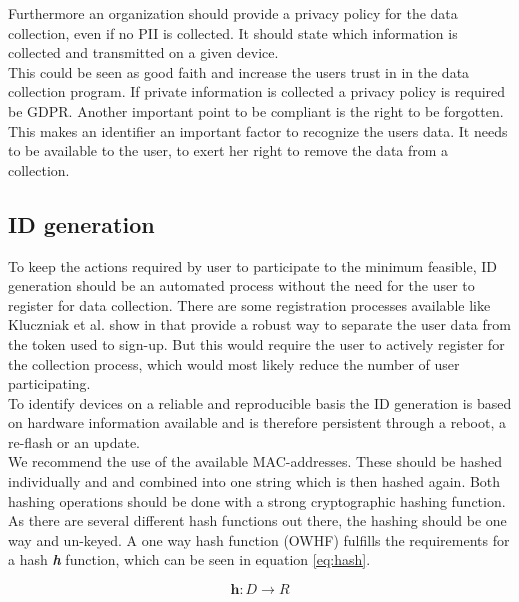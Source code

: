         Furthermore an organization should provide a privacy policy for the data collection, even if no PII is collected. It should state which information is collected and transmitted on a given device.\\
        This could be seen as good faith and increase the users trust in in the data collection program. If private information is collected a privacy policy is required be GDPR. Another important point to be compliant is the right to be forgotten. This makes an identifier an important factor to recognize the users data. It needs to be available to the user, to exert her right to remove the data from a collection.
        
          
    \subsection{ID generation}
        \label{subsec:software_design:id}
        To keep the actions required by user to participate to the minimum feasible, ID generation should be an automated process without the need for the user to register for data collection. There are some registration processes available like Kluczniak et al. show in \cite{kluczniak_anonymous_2015} that provide a robust way to separate the user data from the token used to sign-up. But this would require the user to actively register for the collection process, which would most likely reduce the number of user participating.\\
        
        To identify devices on a reliable and reproducible basis the ID generation is based on hardware information available and is therefore persistent through a reboot, a re-flash or an update.\\
        We recommend the use of the available MAC-addresses. These should be hashed individually and and combined into one string which is then hashed again. Both hashing operations should be done with a strong cryptographic hashing function.
        As there are several different hash functions out there, the hashing should be one way and un-keyed. A one way hash function (OWHF) fulfills the requirements for a hash \textbf{\textit{h}} function, which can be seen in equation \ref{eq:hash}\cite{sobti_cryptographic_2012}.
        
        \begin{equation}
            \label{eq:hash}
            \textbf{h} : D \longrightarrow R
        \end{equation}
        
